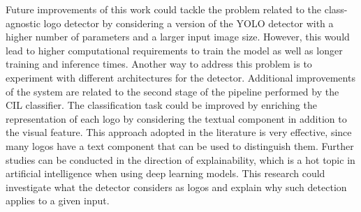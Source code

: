 Future improvements of this work could tackle the problem related to the class-agnostic logo detector by considering a version of the YOLO detector \cite{glenn_jocher_2021_5563715} with a higher number of parameters and a larger input image size.
However, this would lead to higher computational requirements to train the model as well as longer training and inference times.
Another way to address this problem is to experiment with different architectures for the detector.
Additional improvements of the system are related to the second stage of the pipeline performed by the CIL classifier.
The classification task could be improved by enriching the representation of each logo by considering the textual component in addition to the visual feature.
This approach adopted in the literature is very effective, since many logos have a text component that can be used to distinguish them.
Further studies can be conducted in the direction of explainability, which is a hot topic in artificial intelligence when using deep learning models. This research could investigate what the detector considers as logos and explain why such detection applies to a given input.